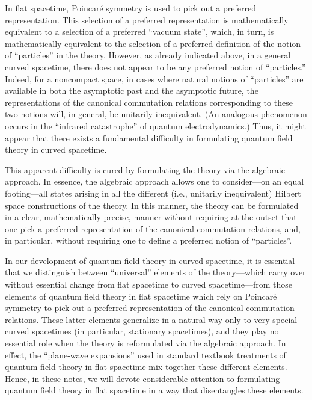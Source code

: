 \documentclass[11pt,a4paper]{article}
\begin{document}
In flat spacetime, Poincaré symmetry is used to pick out a preferred representation. This selection of a preferred representation is mathematically equivalent to a selection of a preferred ``vacuum state'', which, in turn, is mathematically equivalent to the selection of a preferred definition of the notion of ``particles'' in the theory. However, as already indicated above, in a general curved spacetime, there does not appear to be any preferred notion of ``particles.'' Indeed, for a noncompact space, in cases where natural notions of ``particles'' are available in both the asymptotic past and the asymptotic future, the representations of the canonical commutation relations corresponding to these two notions will, in general, be unitarily inequivalent. (An analogous phenomenon occurs in the ``infrared catastrophe'' of quantum electrodynamics.) Thus, it might \hypertarget{source-17}{} appear that there exists a fundamental difficulty in formulating quantum field theory in curved spacetime.

This apparent difficulty is cured by formulating the theory via the algebraic approach. In essence, the algebraic approach allows one to consider---on an equal footing---all states arising in all the different (i.e., unitarily inequivalent) Hilbert space constructions of the theory. In this manner, the theory can be formulated in a clear, mathematically precise, manner without requiring at the outset that one pick a preferred representation of the canonical commutation relations, and, in particular, without requiring one to define a preferred notion of ``particles''.

In our development of quantum field theory in curved spacetime, it is essential that we distinguish between ``universal'' elements of the theory---which carry over without essential change from flat spacetime to curved spacetime---from those elements of quantum field theory in flat spacetime which rely on Poincaré symmetry to pick out a preferred representation of the canonical commutation relations. These latter elements generalize in a natural way only to very special curved spacetimes (in particular, stationary spacetimes), and they play no essential role when the theory is reformulated via the algebraic approach. In effect, the ``plane-wave expansions'' used in standard textbook treatments of quantum field theory in flat spacetime mix together these different elements. Hence, in these notes, we will devote considerable attention to formulating quantum field theory in flat spacetime in a way that disentangles these elements.
\end{document}

